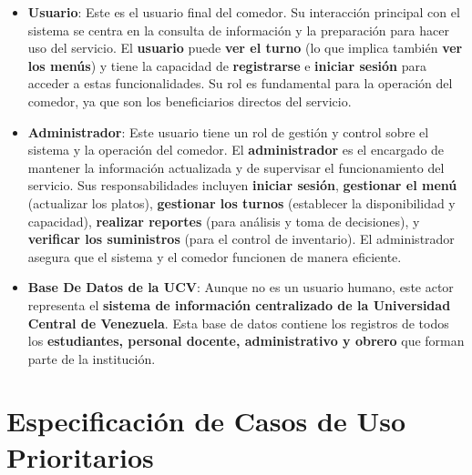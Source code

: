 \documentclass[12pt]{article}
\begin{document}
\begin{itemize}
	\item \textbf{Usuario}: Este es el usuario final del comedor. Su interacción principal con el sistema se centra en la consulta de información y la preparación para hacer uso del servicio. El \textbf{usuario} puede \textbf{ver el turno} (lo que implica también \textbf{ver los menús}) y tiene la capacidad de \textbf{registrarse} e \textbf{iniciar sesión} para acceder a estas funcionalidades. Su rol es fundamental para la operación del comedor, ya que son los beneficiarios directos del servicio.

	\item \textbf{Administrador}: Este usuario tiene un rol de gestión y control sobre el sistema y la operación del comedor. El \textbf{administrador} es el encargado de mantener la información actualizada y de supervisar el funcionamiento del servicio. Sus responsabilidades incluyen \textbf{iniciar sesión}, \textbf{gestionar el menú} (actualizar los platos), \textbf{gestionar los turnos} (establecer la disponibilidad y capacidad), \textbf{realizar reportes} (para análisis y toma de decisiones), y \textbf{verificar los suministros} (para el control de inventario). El administrador asegura que el sistema y el comedor funcionen de manera eficiente.

	\item \textbf{Base De Datos de la UCV}: Aunque no es un usuario humano, este actor representa el \textbf{sistema de información centralizado de la Universidad Central de Venezuela}. Esta base de datos contiene los registros de todos los \textbf{estudiantes, personal docente, administrativo y obrero} que forman parte de la institución.
\end{itemize}

\pagebreak
\section{Especificación de Casos de Uso Prioritarios}
\end{document}
